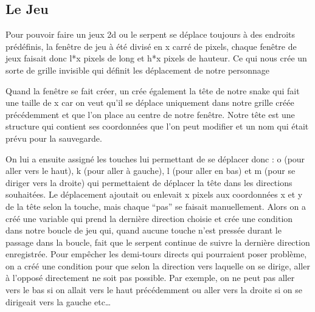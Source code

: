 \documentclass{article}
\begin{document}
\subsection{Le Jeu}
Pour pouvoir faire un jeux 2d ou le serpent se déplace toujours à des endroits prédéfinis, la fenêtre de jeu à été divisé en x carré de pixels, chaque fenêtre de jeux faisait donc l*x pixels de long et h*x pixels de hauteur. Ce qui nous crée un sorte de grille invisible qui définit les déplacement de notre personnage

Quand la fenêtre se fait créer, un crée également la tête de notre snake qui fait une taille de x car on veut qu’il se déplace uniquement dans notre grille créée précédemment et que l’on place au centre de notre fenêtre.
Notre tête est une structure qui contient ses coordonnées que l’on peut modifier et un nom qui était prévu pour la sauvegarde.

On lui a ensuite assigné les touches lui permettant de se déplacer donc : o (pour aller vers le haut), k (pour aller à gauche), l (pour aller en bas) et m (pour se diriger vers la droite) qui permettaient de déplacer la tête dans les directions souhaitées.  Le déplacement ajoutait ou enlevait x pixels aux coordonnées x et y de la tête selon la touche, mais chaque “pas” se faisait manuellement. 
Alors on a créé une variable qui prend la dernière direction choisie et crée une condition dans notre boucle de jeu qui, quand aucune touche n’est pressée durant le passage dans la boucle, fait que le serpent continue de suivre la dernière direction enregistrée. Pour empêcher les demi-tours directs qui pourraient poser problème, on a créé une condition pour que selon la direction vers laquelle on se dirige, aller à l’opposé directement ne soit pas possible. 
Par exemple, on ne peut pas aller vers le bas si on allait vers le haut précédemment ou aller vers la droite si on se dirigeait vers la gauche etc…
\end{document}
